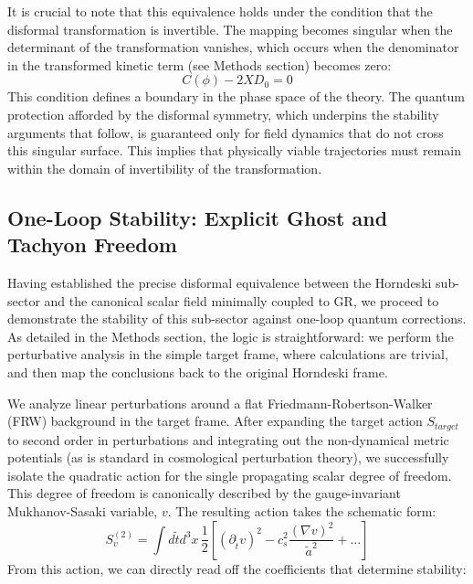 \documentclass[twocolumn]{aastex631}
\begin{document}
It is crucial to note that this equivalence holds under the condition that the disformal transformation is invertible. The mapping becomes singular when the determinant of the transformation vanishes, which occurs when the denominator in the transformed kinetic term (see Methods section) becomes zero:
\begin{equation}
C(\phi) - 2XD_0 = 0
\end{equation}
This condition defines a boundary in the phase space of the theory. The quantum protection afforded by the disformal symmetry, which underpins the stability arguments that follow, is guaranteed only for field dynamics that do not cross this singular surface. This implies that physically viable trajectories must remain within the domain of invertibility of the transformation.

\subsection{One-Loop Stability: Explicit Ghost and Tachyon Freedom}

Having established the precise disformal equivalence between the Horndeski sub-sector and the canonical scalar field minimally coupled to GR, we proceed to demonstrate the stability of this sub-sector against one-loop quantum corrections. As detailed in the Methods section, the logic is straightforward: we perform the perturbative analysis in the simple target frame, where calculations are trivial, and then map the conclusions back to the original Horndeski frame.

We analyze linear perturbations around a flat Friedmann-Robertson-Walker (FRW) background in the target frame. After expanding the target action $S_{target}$ to second order in perturbations and integrating out the non-dynamical metric potentials (as is standard in cosmological perturbation theory), we successfully isolate the quadratic action for the single propagating scalar degree of freedom. This degree of freedom is canonically described by the gauge-invariant Mukhanov-Sasaki variable, $v$. The resulting action takes the schematic form:
\begin{equation}
S_v^{(2)} = \int d\tilde{t} d^3x \, \frac{1}{2} \left[ (\partial_{\tilde{t}} v)^2 - c_s^2 \frac{(\nabla v)^2}{\tilde{a}^2} + \dots \right]
\end{equation}
From this action, we can directly read off the coefficients that determine stability:
\end{document}
